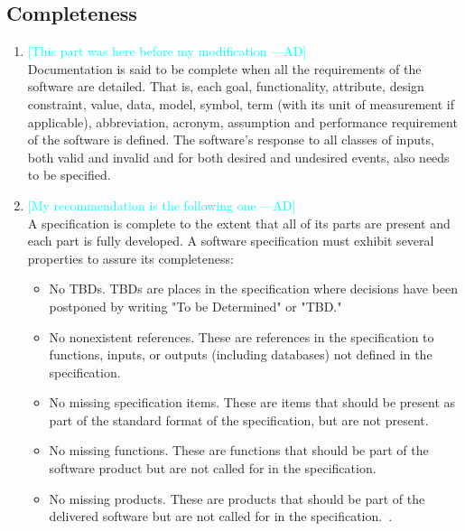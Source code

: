 \documentclass[letterpaper,cleveref]{lipics-v2019}
\newcommand{\authornote}[3]{\textcolor{#1}{[#3 ---#2]}}
\newcommand{\authornote}[3]{}
\newcommand{\ad}[1]{\authornote{cyan}{AD}{#1}} %
\theoremstyle{definition}
\begin{document}
\subsection{Completeness}
\begin{enumerate}[(1).]
    \item
    \ad{This part was here before my modification}\\
    Documentation is said to be complete when all the requirements of the software are detailed. That is, each goal, functionality, attribute, design constraint, value, data, model, symbol, term (with its unit of measurement if applicable), abbreviation, acronym, assumption and performance requirement of the software is defined.  The software's response to all classes of inputs, both valid and invalid and for both desired and undesired events, also needs to be specified.

    \item
    \ad{My recommendation is the following one}\\
    A specification is complete to the extent that all of its parts are present and each part is fully developed. A software specification must exhibit several properties to assure its completeness:
    \begin{itemize}
        \item No TBDs. TBDs are places in the specification where decisions have been postponed by writing "To be Determined" or "TBD."
        \item No nonexistent references. These are references in the specification to functions, inputs, or outputs (including databases) not defined in the specification.
        \item No missing specification items. These are items that should be present as part of the standard format of the specification, but are not present.
        \item No missing functions. These are functions that should be part of the software product but are not called for in the specification.
        \item No missing products. These are products that should be part of the delivered software but are not called for in the specification.~\cite{Boehm1984}.
    \end{itemize}
\end{enumerate}
\end{document}
